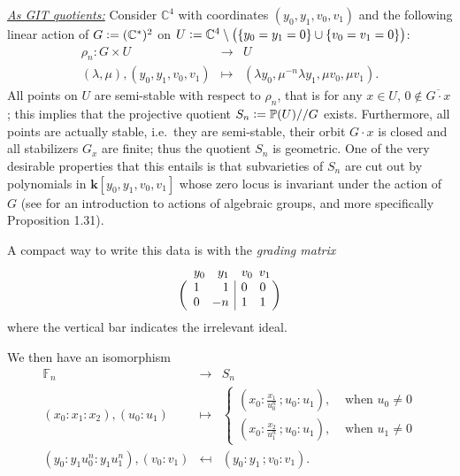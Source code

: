 \documentclass[a4paper,11pt]{amsart}
\newcommand{\CC}{\mathbb{C}}
\newcommand{\PP}{\mathbb{P}}
\renewcommand{\FF}{\mathbb{F}}
\newcommand{\kk}{\textbf{k}}
\newcommand{\defeq}{\vcentcolon=}
\begin{document}
\noindent\hypertarget{hirzGIT}{\underline{\emph{As GIT quotients:}}}
Consider $\CC^4$ with coordinates $(y_0,y_1,v_0,v_1)$ and the following linear action of $G \defeq (\CC^*)^2$ on  $U \defeq \CC^4 \setminus \big( \{y_0=y_1 =0\}\cup \{v_0= v_1 =0\} \big)$:
\[
\begin{array}{ccc}
	\rho_n\colon G \times U & \to & U\\
	(\lambda,\mu), (y_0,y_1,v_0,v_1) & \mapsto & (\lambda y_0,\mu^{-n}\lambda y_1,\mu v_0,\mu v_1).
\end{array}
\]
All points on $U$ are semi-stable with respect to $\rho_n$, that is for any $x\in U$, $0 \not\in \overline{G\cdot x}$;
this implies that the projective quotient $S_n \defeq \PP(U)//G$ exists.
Furthermore, all points are actually stable, i.e.\ they are semi-stable, their orbit $G\cdot x$ is closed and all stabilizers $G_x$ are finite;
thus the quotient $S_n$ is geometric.
One of the very desirable properties that this entails is that  subvarieties of $S_n$ are cut out by polynomials in $\kk[y_0,y_1,v_0,v_1]$ whose zero locus is invariant under the action of $G$ (see \cite{Brion} for an introduction to actions of algebraic groups, and more specifically Proposition 1.31).

A compact way to write this data is with the \emph{grading matrix}
\[
\begin{array}{c}	
	\hspace{4pt}
	\begin{array}{cccc}
		y_0 & y_1 & v_0 & 
		\hspace{-5pt}v_1 
	\end{array}\\
	\left(
	\begin{array}{rr|rr}
		1 & 1 & 0 & 0\\
		0 & -n & 1 & 1
	\end{array}	
	\right)
\end{array}
\]
where the vertical bar indicates the irrelevant ideal.

We then have an isomorphism
\[
\begin{array}{ccc}
	\FF_n & \to & S_n\\
	(x_0:x_1:x_2),(u_0:u_1) & \mapsto & 
	\left\{ 
	\begin{array}{cc}
		\left(x_0:\frac{x_1}{u_0^n} \,; u_0:u_1\right), & \text{ when } u_0 \neq 0 \\
		\left(x_0:\frac{x_2}{u_1^n} \,; u_0:u_1\right), & \text{ when } u_1 \neq 0
	\end{array}
	\right.\\
	(y_0:y_1u_0^n:y_1u_1^n),(v_0:v_1) & \mapsfrom & (y_0:y_1\,; v_0:v_1).
\end{array}
\]
\end{document}
